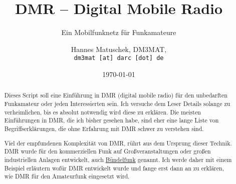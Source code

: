 \documentclass[11pt, a4paper,parskip=half]{scrartcl}
\title{DMR -- Digital Mobile Radio}
\subtitle{Ein Mobilfunknetz für Funkamateure}
\author{Hannes Matuschek, DM3MAT,\\\texttt{dm3mat [at] darc [dot] de}}
\date{\today}
\begin{document}
\begin{titlepage}
\maketitle
\vfill
\begin{abstract}
 Dieses Script soll eine Einführung in DMR (digital mobile radio) für den 
 unbedarften Funkamateur oder jeden Interessierten sein. Ich versuche dem 
 Leser Details solange zu verheimlichen, bis es absolut notwendig wird 
 diese zu erklären. Die meisten
 Einführungen in DMR, die ich bisher gesehen habe, sind eher eine lange Liste
 von Begriffserklärungen, die ohne Erfahrung mit DMR schwer zu verstehen sind. 
  
 Viel der empfundenen Komplexität von DMR, rührt aus dem Ursprung dieser 
 Technik. DMR wurde für den kommerziellen Funk auf Großveranstaltungen oder 
 großen industriellen Anlagen entwickelt, auch 
 \href{https://de.wikipedia.org/wiki/B\%C3\%BCndelfunk}{Bündelfunk} genannt. 
 Ich werde daher mit einem Beispiel erläutern wofür DMR entwickelt wurde und fange erst dann
 an zu erklären, wie DMR für den Amateurfunk eingesetzt wird.
\end{abstract}
\end{titlepage}
\pagebreak

\tableofcontents
\pagebreak









	













\appendix
\printindex
\end{document}
